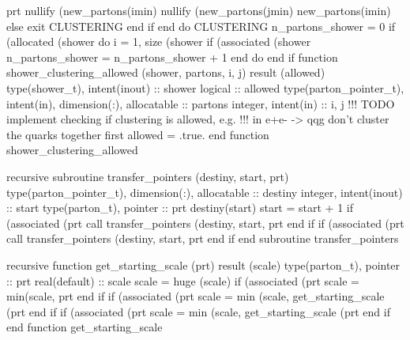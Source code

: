       prt%
      nullify (new_partons(imin)%
      nullify (new_partons(jmin)%
      new_partons(imin)%
   else
      exit CLUSTERING
   end if
end do CLUSTERING
\nwendcode{}\nwdocspar
\nwenddocs{}\endmoddef
n_partons_shower = 0
if (allocated (shower%
   do i = 1, size (shower%
      if (associated (shower%
           n_partons_shower = n_partons_shower + 1
   end do
end if
\nwendcode{}\nwdocspar
\nwenddocs{}\endmoddef
function shower_clustering_allowed (shower, partons, i, j) result (allowed)
  type(shower_t), intent(inout) :: shower
  logical :: allowed
  type(parton_pointer_t), intent(in), dimension(:), allocatable :: partons
  integer, intent(in) :: i, j
  !!! TODO implement checking if clustering is allowed, e.g.
  !!!     in e+e- -> qqg don't cluster the quarks together first
  allowed = .true.
end function shower_clustering_allowed

\nwendcode{}\nwdocspar
\nwenddocs{}\endmoddef
recursive subroutine transfer_pointers (destiny, start, prt)
  type(parton_pointer_t), dimension(:), allocatable :: destiny
  integer, intent(inout) :: start
  type(parton_t), pointer :: prt
  destiny(start)%
  start = start + 1
  if (associated (prt%
     call transfer_pointers (destiny, start, prt%
  end if
  if (associated (prt%
     call transfer_pointers (destiny, start, prt%
  end if
end subroutine transfer_pointers

\nwendcode{}\nwdocspar
\nwenddocs{}\plusendmoddef
recursive function get_starting_scale (prt) result (scale)
  type(parton_t), pointer :: prt
  real(default) :: scale
  scale = huge (scale)
  if (associated (prt%
     scale = min(scale, prt%
  end if
  if (associated (prt%
     scale = min (scale, get_starting_scale (prt%
  end if
  if (associated (prt%
     scale = min (scale, get_starting_scale (prt%
  end if
end function get_starting_scale

